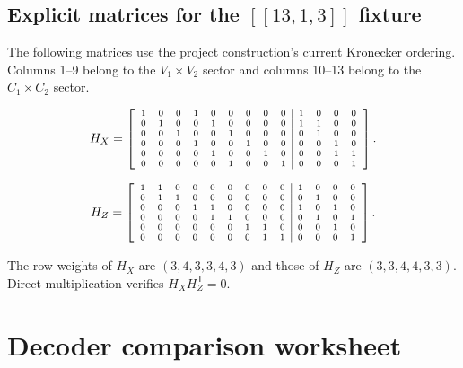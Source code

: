 \documentclass[11pt,letterpaper]{article}
\begin{document}
\begin{landscape}
\thispagestyle{empty}
\section{Explicit matrices for the \texorpdfstring{$[[13,1,3]]$}{[[13,1,3]]} fixture}
\label{app:matrices}

The following matrices use the project construction's current Kronecker ordering. Columns 1--9
belong to the $V_1\times V_2$ sector and columns 10--13 belong to the $C_1\times C_2$ sector.

\begin{equation}
\scriptsize
H_X=\left[
\begin{array}{ccccccccc|cccc}
1&0&0&1&0&0&0&0&0&1&0&0&0\\
0&1&0&0&1&0&0&0&0&1&1&0&0\\
0&0&1&0&0&1&0&0&0&0&1&0&0\\
0&0&0&1&0&0&1&0&0&0&0&1&0\\
0&0&0&0&1&0&0&1&0&0&0&1&1\\
0&0&0&0&0&1&0&0&1&0&0&0&1
\end{array}
\right].
\end{equation}

\begin{equation}
\scriptsize
H_Z=\left[
\begin{array}{ccccccccc|cccc}
1&1&0&0&0&0&0&0&0&1&0&0&0\\
0&1&1&0&0&0&0&0&0&0&1&0&0\\
0&0&0&1&1&0&0&0&0&1&0&1&0\\
0&0&0&0&1&1&0&0&0&0&1&0&1\\
0&0&0&0&0&0&1&1&0&0&0&1&0\\
0&0&0&0&0&0&0&1&1&0&0&0&1
\end{array}
\right].
\end{equation}

The row weights of $H_X$ are $(3,4,3,3,4,3)$ and those of $H_Z$ are
$(3,3,4,4,3,3)$. Direct multiplication verifies $H_XH_Z^{\mathsf T}=0$.
\end{landscape}

\section{Decoder comparison worksheet}
\end{document}
